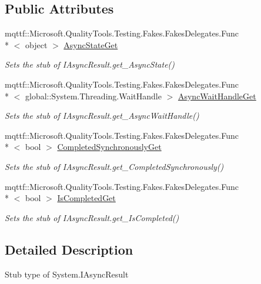 \subsection*{Public Attributes}
\begin{DoxyCompactItemize}
\item 
mqttf\-::\-Microsoft.\-Quality\-Tools.\-Testing.\-Fakes.\-Fakes\-Delegates.\-Func\\*
$<$ object $>$ \hyperlink{class_system_1_1_fakes_1_1_stub_i_async_result_a5de67399d518c888e0b9fef584efc2c0}{Async\-State\-Get}
\begin{DoxyCompactList}\small\item\em Sets the stub of I\-Async\-Result.\-get\-\_\-\-Async\-State()\end{DoxyCompactList}\item 
mqttf\-::\-Microsoft.\-Quality\-Tools.\-Testing.\-Fakes.\-Fakes\-Delegates.\-Func\\*
$<$ global\-::\-System.\-Threading.\-Wait\-Handle $>$ \hyperlink{class_system_1_1_fakes_1_1_stub_i_async_result_a971e3194aa4bcd8fedcd36aeb0119d4b}{Async\-Wait\-Handle\-Get}
\begin{DoxyCompactList}\small\item\em Sets the stub of I\-Async\-Result.\-get\-\_\-\-Async\-Wait\-Handle()\end{DoxyCompactList}\item 
mqttf\-::\-Microsoft.\-Quality\-Tools.\-Testing.\-Fakes.\-Fakes\-Delegates.\-Func\\*
$<$ bool $>$ \hyperlink{class_system_1_1_fakes_1_1_stub_i_async_result_a3e4b088594c0f7c329cbc026ce72526b}{Completed\-Synchronously\-Get}
\begin{DoxyCompactList}\small\item\em Sets the stub of I\-Async\-Result.\-get\-\_\-\-Completed\-Synchronously()\end{DoxyCompactList}\item 
mqttf\-::\-Microsoft.\-Quality\-Tools.\-Testing.\-Fakes.\-Fakes\-Delegates.\-Func\\*
$<$ bool $>$ \hyperlink{class_system_1_1_fakes_1_1_stub_i_async_result_aea56f5c046b78a4705d06db301186f24}{Is\-Completed\-Get}
\begin{DoxyCompactList}\small\item\em Sets the stub of I\-Async\-Result.\-get\-\_\-\-Is\-Completed()\end{DoxyCompactList}\end{DoxyCompactItemize}


\subsection{Detailed Description}
Stub type of System.\-I\-Async\-Result



